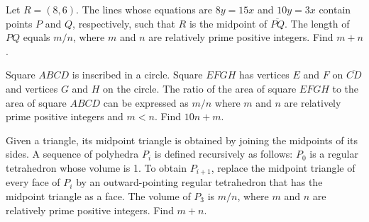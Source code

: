 \documentclass[11pt]{article}
\theoremstyle{definition}
\begin{document}
%	













\begin{question}[name={2001 AIME II, \href{https://artofproblemsolving.com/community/c4p714296}{Problem 4}}]
	Let $R=(8,6)$. The lines whose equations are $8y=15x$ and $10y=3x$ contain points $P$ and $Q$, respectively, such that $R$ is the midpoint of $\overline{PQ}$. The length of $PQ$ equals ${m}/{n}$, where $m$ and $n$ are relatively prime positive integers. Find $m+n$.
\end{question}


%	












\begin{question}[name={2001 AIME II, \href{https://artofproblemsolving.com/community/c4p714300}{Problem 6}}]
	Square $ABCD$ is inscribed in a circle. Square $EFGH$ has vertices $E$ and $F$ on $\overline{CD}$ and vertices $G$ and $H$ on the circle. The ratio of the area of square $EFGH$ to the area of square $ABCD$ can be expressed as ${m}/{n}$ where $m$ and $n$ are relatively prime positive integers and $m<n$. Find $10n+m$.	
\end{question}


%	








\begin{question}[name={2001 AIME II, \href{https://artofproblemsolving.com/community/c4p714309}{Problem 12}}]
	Given a triangle, its midpoint triangle is obtained by joining the midpoints of its sides. A sequence of polyhedra $P_{i}$ is defined recursively as follows: $P_{0}$ is a regular tetrahedron whose volume is 1. To obtain $P_{i+1}$, replace the midpoint triangle of every face of $P_{i}$ by an outward-pointing regular tetrahedron that has the midpoint triangle as a face. The volume of $P_{3}$ is ${m}/{n}$, where $m$ and $n$ are relatively prime positive integers. Find $m+n$.	
	
\end{question}
\end{document}
